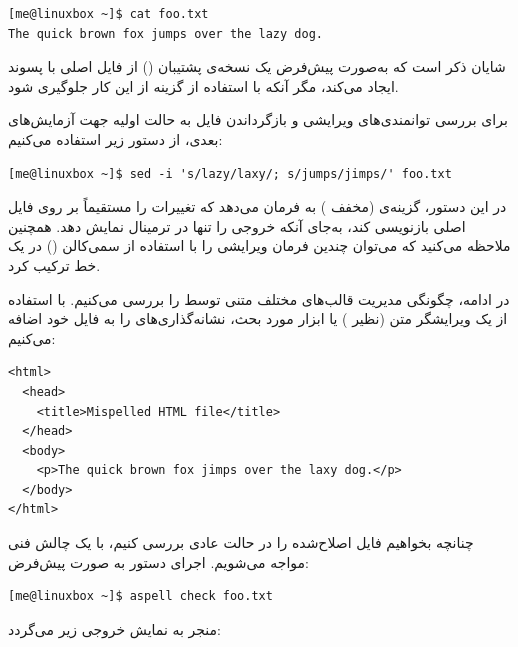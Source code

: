 \begin{latin}
\begin{lstlisting}
[me@linuxbox ~]$ cat foo.txt
The quick brown fox jumps over the lazy dog.
\end{lstlisting}
\end{latin}

شایان ذکر است که  به‌صورت پیش‌فرض یک نسخه‌ی پشتیبان () از فایل اصلی با پسوند  ایجاد می‌کند، مگر آنکه با استفاده از گزینه  از این کار جلوگیری شود.

برای بررسی توانمندی‌های ویرایشی  و بازگرداندن فایل به حالت اولیه جهت آزمایش‌های بعدی، از دستور زیر استفاده می‌کنیم:

\begin{latin}
\begin{lstlisting}
[me@linuxbox ~]$ sed -i 's/lazy/laxy/; s/jumps/jimps/' foo.txt
\end{lstlisting}
\end{latin}

در این دستور، گزینه‌ی  (مخفف ) به  فرمان می‌دهد که تغییرات را مستقیماً بر روی فایل اصلی بازنویسی کند، به‌جای آنکه خروجی را تنها در ترمینال نمایش دهد. همچنین ملاحظه می‌کنید که می‌توان چندین فرمان ویرایشی را با استفاده از سمی‌کالن (\cmd{;}) در یک خط ترکیب کرد.

در ادامه، چگونگی مدیریت قالب‌های مختلف متنی توسط  را بررسی می‌کنیم. با استفاده از یک ویرایشگر متن (نظیر ) یا ابزار  مورد بحث، نشانه‌گذاری‌های  را به فایل خود اضافه می‌کنیم:

\begin{latin}
\begin{lstlisting}
<html>
  <head>
    <title>Mispelled HTML file</title>
  </head>
  <body>
    <p>The quick brown fox jimps over the laxy dog.</p>
  </body>
</html>
\end{lstlisting}
\end{latin}

چنانچه بخواهیم فایل اصلاح‌شده را در حالت عادی بررسی کنیم، با یک چالش فنی مواجه می‌شویم. اجرای دستور به صورت پیش‌فرض:

\begin{latin}
\begin{lstlisting}
[me@linuxbox ~]$ aspell check foo.txt
\end{lstlisting}
\end{latin}

منجر به نمایش خروجی زیر می‌گردد:

